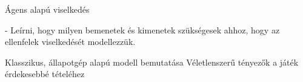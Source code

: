 \label{Chap:viselkedes}

Ágens alapú viselkedés

- Leírni, hogy milyen bemenetek és kimenetek szükségesek ahhoz, hogy az ellenfelek viselkedését modellezzük.

Klasszikus, állapotgép alapú modell bemutatása
Véletlenszerű tényezők a játék érdekesebbé tételéhez
